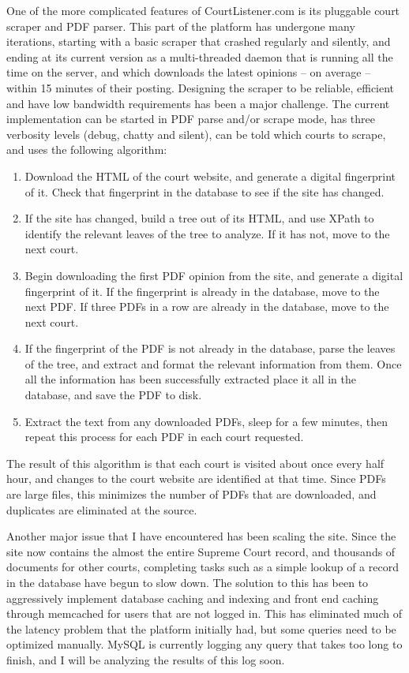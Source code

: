 One of the more complicated features of CourtListener.com is its pluggable court scraper and PDF parser. This part of the platform has undergone many iterations, starting with a basic scraper that crashed regularly and silently, and ending at its current version as a multi-threaded daemon that is running all the time on the server, and which downloads the latest opinions -- on average -- within 15 minutes of their posting. Designing the scraper to be reliable, efficient and have low bandwidth requirements has been a major challenge. The current implementation can be started in PDF parse and/or scrape mode, has three verbosity levels (debug, chatty and silent), can be told which courts to scrape, and uses the following algorithm:
\begin{enumerate}
    \item{Download the HTML of the court website, and generate a digital fingerprint of it. Check that fingerprint in the database to see if the site has changed.}
    \item{If the site has changed, build a tree out of its HTML, and use XPath to identify the relevant leaves of the tree to analyze. If it has not, move to the next court.}
    \item{Begin downloading the first PDF opinion from the site, and generate a digital fingerprint of it. If the fingerprint is already in the database, move to the next PDF. If three PDFs in a row are already in the database, move to the next court.}
    \item{If the fingerprint of the PDF is not already in the database, parse the leaves of the tree, and extract and format the relevant information from them. Once all the information has been successfully extracted place it all in the database, and save the PDF to disk.}
    \item{Extract the text from any downloaded PDFs, sleep for a few minutes, then repeat this process for each PDF in each court requested.}
\end{enumerate}
The result of this algorithm is that each court is visited about once every half hour, and changes to the court website are identified at that time. Since PDFs are large files, this minimizes the number of PDFs that are downloaded, and duplicates are eliminated at the source.

Another major issue that I have encountered has been scaling the site. Since the site now contains the almost the entire Supreme Court record, and thousands of documents for other courts, completing tasks such as a simple lookup of a record in the database have begun to slow down. The solution to this has been to aggressively implement database caching and indexing and front end caching through memcached for users that are not logged in. This has eliminated much of the latency problem that the platform initially had, but some queries need to be optimized manually. MySQL is currently logging any query that takes too long to finish, and I will be analyzing the results of this log soon.
